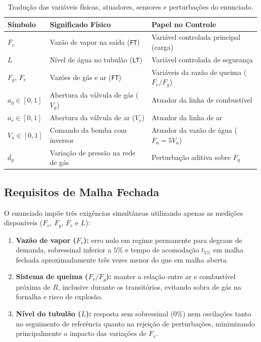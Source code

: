 \documentclass[12pt,a4paper]{article}
\begin{document}
\begin{table}[H]
\centering
\caption{Tradu\c{c}\~ao das vari\'aveis f\'isicas, atuadores, sensores e perturba\c{c}\~oes do enunciado.}
\label{tab:variaveis_enunciado}
\begin{tabular}{@{}lll@{}}
\toprule
\textbf{S\'imbolo} & \textbf{Significado F\'isico} & \textbf{Papel no Controle} \\
\midrule
$F_v$ & Vaz\~ao de vapor na sa\'ida (\texttt{FT}) & Vari\'avel controlada principal (carga) \\
$L$ & N\'ivel de \'agua no tubul\~ao (\texttt{LT}) & Vari\'avel controlada de seguran\c{c}a \\
$F_g$, $F_r$ & Vaz\~oes de g\'as e ar (\texttt{FT}) & Vari\'aveis da raz\~ao de queima ($F_r/F_g$) \\
$a_g \in [0,1]$ & Abertura da v\'alvula de g\'as ($V_g$) & Atuador da linha de combust\'ivel \\
$a_r \in [0,1]$ & Abertura da v\'alvula de ar ($V_r$) & Atuador da linha de ar \\
$V_a \in [0,1]$ & Comando da bomba com inversor & Atuador da vaz\~ao de \'agua ($F_a = 5 V_a$) \\
$d_g$ & Varia\c{c}\~ao de press\~ao na rede de g\'as & Perturba\c{c}\~ao aditiva sobre $F_g$ \\
\bottomrule
\end{tabular}
\end{table}

\subsection{Requisitos de Malha Fechada}
O enunciado imp\~oe tr\^es exig\^encias simult\^aneas utilizando apenas as medi\c{c}\~oes dispon\'iveis ($F_v$, $F_g$, $F_r$ e $L$):
\begin{enumerate}
    \item \textbf{Vaz\~ao de vapor ($F_v$):} erro nulo em regime permanente para degraus de demanda, sobressinal inferior a $5\%$ e tempo de acomoda\c{c}\~ao $t_{5\%}$ em malha fechada aproximadamente tr\^es vezes menor do que em malha aberta.
    \item \textbf{Sistema de queima ($F_r/F_g$):} manter a rela\c{c}\~ao entre ar e combust\'ivel pr\'oxima de $R$, inclusive durante os transit\'orios, evitando sobra de g\'as na fornalha e risco de explos\~ao.
    \item \textbf{N\'ivel do tubul\~ao ($L$):} resposta sem sobressinal ($0\%$) nem oscila\c{c}\~oes tanto no seguimento de refer\^encia quanto na rejei\c{c}\~ao de perturba\c{c}\~oes, minimizando principalmente o impacto das varia\c{c}\~oes de $F_v$.
\end{enumerate}
\end{document}
